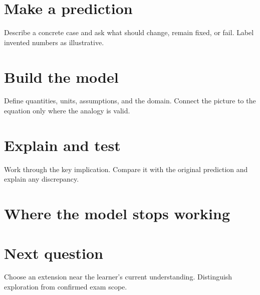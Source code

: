 \documentclass[11pt]{article}
\begin{document}
\section*{Make a prediction}
Describe a concrete case and ask what should change, remain fixed, or fail. Label invented numbers as illustrative.
\section*{Build the model}
Define quantities, units, assumptions, and the domain. Connect the picture to the equation only where the analogy is valid.
\section*{Explain and test}
Work through the key implication. Compare it with the original prediction and explain any discrepancy.
\workarea{0.8in}
\section*{Where the model stops working}
\section*{Next question}
Choose an extension near the learner's current understanding. Distinguish exploration from confirmed exam scope.
\end{document}
